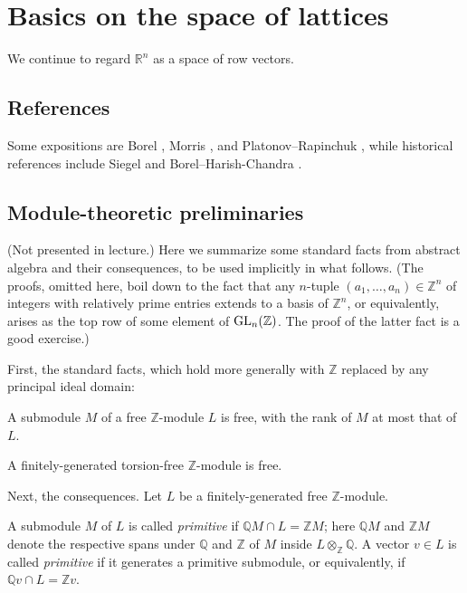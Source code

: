 \documentclass[reqno]{amsart} 
\begin{document}
\section{Basics on the space of lattices}
\label{sec:org5af6785}

We continue to regard \(\mathbb{R}^n\) as a space of row vectors.


\subsection*{References}
\label{sec:}
Some expositions are Borel \cite{MR3970984}, Morris \cite{MR3307755}, and Platonov--Rapinchuk \cite{MR1278263}, while historical references include Siegel \cite{MR3003} and Borel--Harish-Chandra \cite{MR141670, MR147566}.


\subsection{Module-theoretic preliminaries}
\label{sec:}
(Not presented in lecture.)  Here we summarize some standard facts from abstract algebra and their consequences, to be used implicitly in what follows.  (The proofs, omitted here, boil down to the fact that any $n$-tuple $(a_1,\dotsc,a_n)\in \mathbb{Z}^n$ of integers with relatively prime entries extends to a basis of $\mathbb{Z}^n$, or equivalently, arises as the top row of some element of $\operatorname{GL}_n(\mathbb{Z})$. The proof of the latter fact is a good exercise.)

First, the standard facts, which hold more generally with $\mathbb{Z}$ replaced by any principal ideal domain:

\begin{theorem}
  A submodule $M$ of a free $\mathbb{Z}$-module $L$ is free, with the rank of $M$ at most that of $L$.
\end{theorem}
\begin{theorem}\label{thm:torsion-free-implies-free}
  A finitely-generated torsion-free $\mathbb{Z}$-module is free.
\end{theorem}

Next, the consequences.  Let $L$ be a finitely-generated free $\mathbb{Z}$-module.

\begin{definition}
  \label{defn:}
  A submodule $M$ of $L$ is called \emph{primitive} if $\mathbb{Q} M \cap L = \mathbb{Z} M$; here $\mathbb{Q} M$ and $\mathbb{Z} M$ denote the respective spans under $\mathbb{Q}$ and $\mathbb{Z}$ of $M$ inside $L \otimes_{\mathbb{Z}} \mathbb{Q}$.  A vector $v \in L$ is called \emph{primitive} if it generates a primitive submodule, or equivalently, if $\mathbb{Q} v \cap L = \mathbb{Z} v$.
\end{definition}
\end{document}
